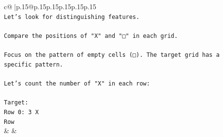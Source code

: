 \documentclass{article}
\begin{document}
{\begin{supertabular}{c@{$\;$}|p{.15\linewidth}@{}p{.15\linewidth}p{.15\linewidth}p{.15\linewidth}p{.15\linewidth}p{.15\linewidth}}
{{{\\ 
\texttt{Let’s look for distinguishing features.} \\
\\ 
\texttt{Compare the positions of "X" and "□" in each grid.} \\
\\ 
\texttt{Focus on the pattern of empty cells (□). The target grid has a specific pattern.} \\
\\ 
\texttt{Let’s count the number of "X" in each row:} \\
\\ 
\texttt{Target:} \\
\texttt{Row 0: 3 X} \\
\texttt{Row} \\
            }
        }
    }
    & & \\ \\


\end{supertabular}}
\end{document}
